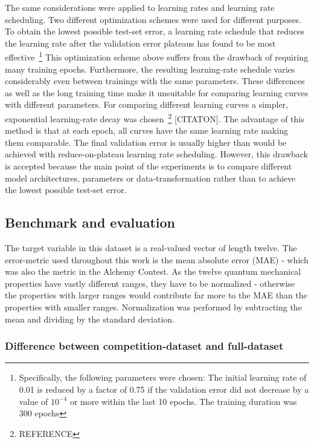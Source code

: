 The same considerations were applied to learning rates and learning rate scheduling. Two different optimization schemes were used for different purposes.
To obtain the lowest possible test-set error, a learning rate schedule that reduces the learning rate after the validation error plateaus has found to be most effective~\footnote{Specifically, the following parameters were chosen: The initial learning rate of 0.01 is reduced by a factor of 0.75 if the validation error did not decrease by a value of $10^{-4}$ or more within the last 10 epochs. The training duration was 300 epochs} This optimization scheme above suffers from the drawback of requiring many training epochs. Furthermore, the resulting learning-rate schedule varies considerably even between trainings with the same parameters. These differences as well as the long training time make it unsuitable for comparing learning curves with different parameters.
For comparing different learning curves a simpler, exponential learning-rate decay was chosen~\footnote{REFERENCE} [CITATON]. The advantage of this method is that at each epoch, all curves have the same learning rate making them comparable. The final validation error is usually higher than would be achieved with reduce-on-plateau learning rate scheduling. However, this drawback is accepted because the main point of the experiments is to compare different model architectures, parameters or data-transformation rather than to achieve the lowest possible test-set error.


\subsection{Benchmark and evaluation}

The target variable in this dataset is a real-valued vector of length twelve. The error-metric used throughout this work is the mean absolute error (MAE) - which was also the metric in the Alchemy Contest. As the twelve quantum mechanical properties have vastly different ranges, they have to be normalized - otherwise the properties with larger ranges would contribute far more to the MAE than the properties with smaller ranges. Normalization was performed by subtracting the mean and dividing by the standard deviation.

\subsubsection{Difference between competition-dataset and full-dataset}


